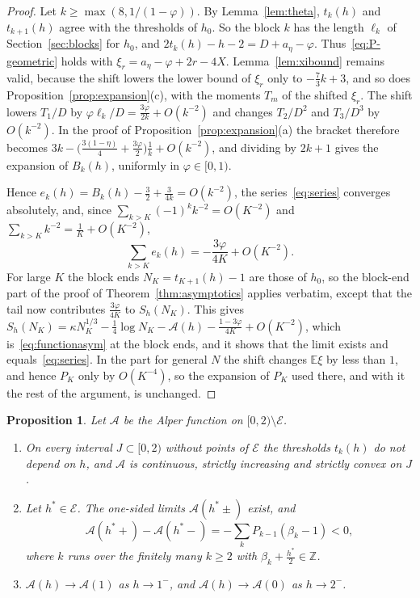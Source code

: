 \documentclass[11pt]{article}
\newtheorem{proposition}[theorem]{Proposition}
\theoremstyle{definition}
\theoremstyle{remark}
\newcommand{\E}{\mathbb{E}}
\newcommand{\Alp}{\mathcal{A}}
\begin{document}
\begin{proof}
Let $k\ge\max(8,1/(1-\varphi))$. By Lemma~\ref{lem:theta}, $t_k(h)$ and
$t_{k+1}(h)$ agree with the thresholds of $h_0$. So the block $k$ has the
length $\ell_k$ of Section~\ref{sec:blocks} for $h_0$, and
$2t_k(h)-h-2=D+a_\eta-\varphi$. Thus~\eqref{eq:P-geometric} holds with
$\xi_r=a_\eta-\varphi+2r-4X$. Lemma~\ref{lem:xibound} remains valid,
because the shift lowers the lower bound of $\xi_r$ only to
$-\frac73k+3$, and so does Proposition~\ref{prop:expansion}(c), with the
moments $T_m$ of the shifted $\xi_r$. The shift lowers $T_1/D$ by
$\varphi\ell_k/D=\frac{3\varphi}{2k}+O(k^{-2})$ and changes $T_2/D^2$ and
$T_3/D^3$ by $O(k^{-2})$. In the proof of
Proposition~\ref{prop:expansion}(a) the bracket therefore becomes
$3k-\bigl(\frac{3(1-\eta)}4+\frac{3\varphi}2\bigr)\frac1k+O(k^{-2})$, and
dividing by $2k+1$ gives the expansion of $B_k(h)$, uniformly in
$\varphi\in[0,1)$.

Hence $e_k(h)=B_k(h)-\frac32+\frac3{4k}=O(k^{-2})$, the
series~\eqref{eq:series} converges absolutely, and, since
$\sum_{k>K}(-1)^kk^{-2}=O(K^{-2})$ and
$\sum_{k>K}k^{-2}=\frac1K+O(K^{-2})$,
\[
\sum_{k>K}e_k(h)=-\frac{3\varphi}{4K}+O(K^{-2}).
\]
For large $K$ the block ends $N_K=t_{K+1}(h)-1$ are those of $h_0$, so
the block-end part of the proof of Theorem~\ref{thm:asymptotics} applies
verbatim, except that the tail now contributes $\frac{3\varphi}{4K}$ to
$S_h(N_K)$. This gives
$S_h(N_K)=\kappa N_K^{1/3}-\frac14\log N_K-\Alp(h)-\frac{1-3\varphi}{4K}
+O(K^{-2})$, which is~\eqref{eq:functionasym} at the block ends, and it
shows that the limit exists and equals~\eqref{eq:series}. In the part for
general $N$ the shift changes $\E\xi$ by less than $1$, and hence $P_K$
only by $O(K^{-4})$, so the expansion of $P_K$ used there, and with it
the rest of the argument, is unchanged.
\end{proof}

\begin{proposition}\label{prop:shape}
Let $\Alp$ be the Alper function on $[0,2)\setminus\mathcal E$.
\begin{enumerate}
\item[(a)] On every interval $J\subset[0,2)$ without points of
$\mathcal E$ the thresholds $t_k(h)$ do not depend on $h$, and $\Alp$ is
continuous, strictly increasing and strictly convex on $J$.
\item[(b)] Let $h^*\in\mathcal E$. The one-sided limits $\Alp(h^*\pm)$
exist, and
\[
\Alp(h^*+)-\Alp(h^*-)=-\sum_kP_{k-1}(\beta_k-1)<0,
\]
where $k$ runs over the finitely many $k\ge2$ with
$\beta_k+\frac{h^*}2\in\mathbb Z$.
\item[(c)] $\Alp(h)\to\Alp(1)$ as $h\to1^-$, and $\Alp(h)\to\Alp(0)$ as
$h\to2^-$.
\end{enumerate}
\end{proposition}
\end{document}
